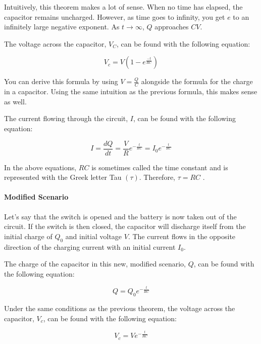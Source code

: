 \documentclass{scrartcl}
\theoremstyle{definition}
\begin{document}
	\noindent Intuitively, this theorem makes a lot of sense. When no time has elapsed, the capacitor remains uncharged. However, as time goes to infinity, you get $e$ to an infinitely large negative exponent. As $t \to \infty$, $Q$ approaches $CV$.
	
	\begin{theorem}
		The voltage across the capacitor, $V_C$, can be found with the following equation:
		
		$$
		V_c = V \left( 1 - e^{\frac{-t}{RC}} \right)
		$$
	\end{theorem}
	
	\noindent You can derive this formula by using $V = \frac{Q}{C}$ alongside the formula for the charge in a capacitor. Using the same intuition as the previous formula, this makes sense as well.
	
	\begin{theorem}
		The current flowing through the circuit, $I$, can be found with the following equation:
		
		$$
		I = \frac{dQ}{dt} = \frac{V}{R} e^{-\frac{t}{RC}} = I_0 e^{-\frac{t}{RC}}
		$$
	\end{theorem}
	
	\noindent In the above equations, $RC$ is sometimes called the time constant and is represented with the Greek letter Tau $(\tau)$. Therefore, $\tau = RC$ . 
	
	\paragraph{Modified Scenario} Let's say that the switch is opened and the battery is now taken out of the circuit. If the switch is then closed, the capacitor will discharge itself from the initial charge of $Q_0$ and initial voltage $V$. The current flows in the opposite direction of the charging current with an initial current $I_0$.
	
	\begin{theorem}
		The charge of the capacitor in this new, modified scenario, $Q$, can be found with the following equation:
		
		$$
		Q = Q_0 e^{-\frac{t}{RC}}
		$$
	\end{theorem}
	
	\begin{theorem}
		Under the same conditions as the previous theorem, the voltage across the capacitor, $V_c$, can be found with the following equation:
		
		$$
		V_c = V e^{-\frac{t}{RC}}
		$$
	\end{theorem}
	
\end{document}
